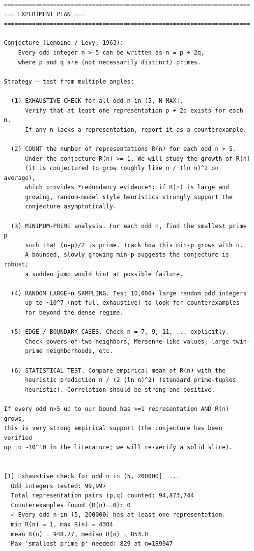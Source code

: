 \documentclass[11pt]{article}
\begin{document}
\begin{lstlisting}
======================================================================
=== EXPERIMENT PLAN ===
======================================================================

Conjecture (Lemoine / Levy, 1963):
    Every odd integer n > 5 can be written as n = p + 2q,
    where p and q are (not necessarily distinct) primes.

Strategy — test from multiple angles:

  (1) EXHAUSTIVE CHECK for all odd n in (5, N_MAX].
      Verify that at least one representation p + 2q exists for each n.
      If any n lacks a representation, report it as a counterexample.

  (2) COUNT the number of representations R(n) for each odd n > 5.
      Under the conjecture R(n) >= 1. We will study the growth of R(n)
      (it is conjectured to grow roughly like n / (ln n)^2 on average),
      which provides *redundancy evidence*: if R(n) is large and
      growing, random-model style heuristics strongly support the
      conjecture asymptotically.

  (3) MINIMUM-PRIME analysis. For each odd n, find the smallest prime p
      such that (n-p)/2 is prime. Track how this min-p grows with n.
      A bounded, slowly growing min-p suggests the conjecture is robust;
      a sudden jump would hint at possible failure.

  (4) RANDOM LARGE-n SAMPLING. Test 10,000+ large random odd integers
      up to ~10^7 (not full exhaustive) to look for counterexamples
      far beyond the dense regime.

  (5) EDGE / BOUNDARY CASES. Check n = 7, 9, 11, ... explicitly.
      Check powers-of-two-neighbors, Mersenne-like values, large twin-
      prime neighborhoods, etc.

  (6) STATISTICAL TEST. Compare empirical mean of R(n) with the
      heuristic prediction n / (2 (ln n)^2) (standard prime-tuples
      heuristic). Correlation should be strong and positive.

If every odd n>5 up to our bound has >=1 representation AND R(n) grows,
this is very strong empirical support (the conjecture has been verified
up to ~10^10 in the literature; we will re-verify a solid slice).


[1] Exhaustive check for odd n in (5, 200000]  ...
  Odd integers tested: 99,997
  Total representation pairs (p,q) counted: 94,873,744
  Counterexamples found (R(n)==0): 0
  ✓ Every odd n in (5, 200000] has at least one representation.
  min R(n) = 1, max R(n) = 4304
  mean R(n) = 948.77, median R(n) = 853.0
  Max 'smallest prime p' needed: 829 at n=189947


\end{lstlisting}
\end{document}
